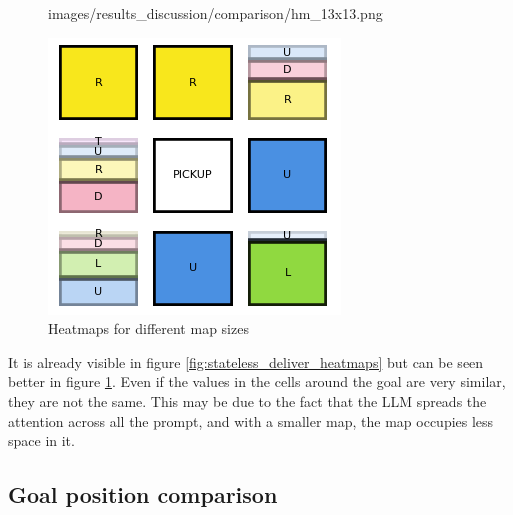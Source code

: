 \begin{figure}[h]
\begin{minipage}[b]{0.19\textwidth}
{      images/results_discussion/comparison/hm_13x13.png
    }
    \caption{13x13}
    \label{fig:hm_13x13}
  \end{minipage}
  \hfill
  \begin{minipage}[b]{0.19\textwidth}
    \centering
    \includegraphics[width=\textwidth]{
      images/results_discussion/comparison/hm_21x21.png
    }
    \caption{21x21}
    \label{fig:hm_21x21}
  \end{minipage}
  \caption{Heatmaps for different map sizes}
  \label{fig:around_comparison}
\end{figure}
\vspace{5mm}

It is already visible in figure \ref{fig:stateless_deliver_heatmaps} but can be seen
better in figure \ref{fig:around_comparison}. Even if the values in the cells
around the goal are very similar, they are not the same. This may be due to the
fact that the LLM spreads the attention across all the prompt, and with a smaller
map, the map occupies less space in it.

\subsection{Goal position comparison}

